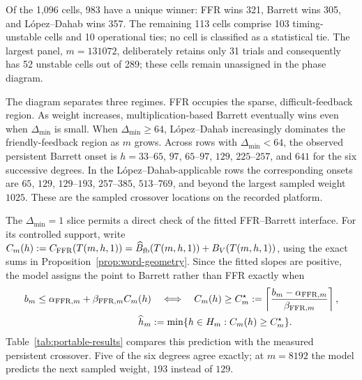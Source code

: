 \documentclass{mcom-l}
\numberwithin{equation}{section}
\theoremstyle{definition}
\theoremstyle{remark}
\newcommand{\Dmin}{\Delta_{\min}}
\begin{document}
Of the 1,096 cells, 983 have a unique winner: FFR wins 321, Barrett wins 305,
and L\'opez--Dahab wins 357.  The remaining 113 cells comprise 103
timing-unstable cells and 10 operational ties; no cell is classified as a
statistical tie.  The largest panel, $m=131072$, deliberately retains only 31
trials and consequently has 52 unstable cells out of 289; these cells remain
unassigned in the phase diagram.

The diagram separates three regimes.  FFR occupies the sparse,
difficult-feedback region.  As weight increases, multiplication-based Barrett
eventually wins even when $\Dmin$ is small.  When $\Dmin\ge64$,
L\'opez--Dahab increasingly dominates the friendly-feedback region as $m$
grows.  Across rows with $\Dmin<64$, the observed persistent Barrett onset is
$h=33$--$65$, $97$, $65$--$97$, $129$, $225$--$257$, and $641$ for the six
successive degrees.  In the L\'opez--Dahab-applicable rows the corresponding
onsets are $65$, $129$, $129$--$193$, $257$--$385$, $513$--$769$, and beyond
the largest sampled weight $1025$.  These are the sampled crossover locations
on the recorded platform.

The $\Dmin=1$ slice permits a direct check of the fitted FFR--Barrett
interface.  For its controlled support, write
$C_m(h):=C_{\rm FFR}(T(m,h,1))
=\widehat B_{\rm fb}(T(m,h,1))+B_V(T(m,h,1))$, using the exact sums in
Proposition~\ref{prop:word-geometry}.
Since the fitted slopes are positive, the model assigns the point to Barrett
rather than FFR exactly when
\begin{equation}
\begin{aligned}
  b_m\le\alpha_{{\rm FFR},m}+\beta_{{\rm FFR},m}C_m(h)
  &\quad\Longleftrightarrow\quad
  C_m(h)\ge C_m^\star
  :=\left\lceil\frac{b_m-\alpha_{{\rm FFR},m}}
                         {\beta_{{\rm FFR},m}}\right\rceil,\\
  \widehat h_m&:=\min\{h\in H_m:C_m(h)\ge C_m^\star\}.
\end{aligned}
  \label{eq:barrett-ffr-crossover}
\end{equation}
Table~\ref{tab:portable-results} compares this prediction with the measured
persistent crossover.  Five of the six degrees agree exactly; at $m=8192$
the model predicts the next sampled weight, $193$ instead of $129$.
\end{document}
